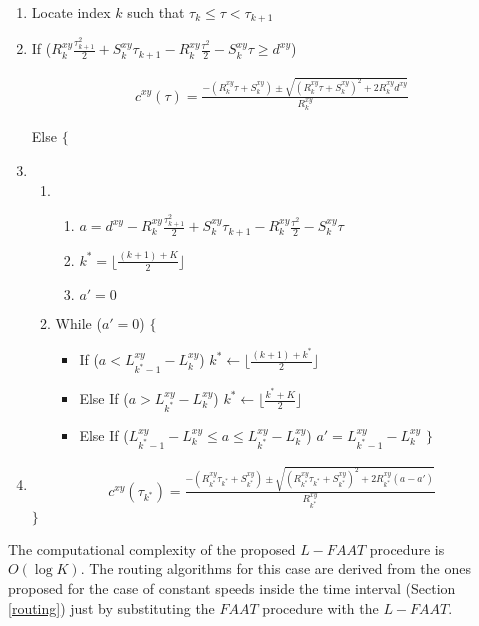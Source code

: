 \documentclass[conference]{IEEEtran}
\begin{document}
\begin{enumerate}
    \item Locate index $k$ such that $\tau_k \leq \tau < \tau_{k+1}$ \label{fattindex}
    \item If ($R_k^{xy}\frac{\tau_{k+1}^2}{2}+S_k^{xy}\tau_{k+1}-R_k^{xy}\frac{\tau^2}{2}-S_k^{xy}\tau\geq d^{xy}$) 
    
\begin{eqnarray}
 &c^{xy}(\tau)=\frac{-(R_k^{xy}\tau+S_k^{xy})\pm\sqrt{(R_k^{xy}\tau+S_k^{xy})^2+2R_k^{xy}d^{xy}}}{R_k^{xy}}& \nonumber
\end{eqnarray}

    Else $\{$
    \item
    \begin{enumerate}
        \item 
        \begin{enumerate}
            \item $a=d^{xy}-R_k^{xy}\frac{\tau_{k+1}^2}{2}+S_k^{xy}\tau_{k+1}-R_k^{xy}\frac{\tau^2}{2}-S_k^{xy}\tau$
            \item $k^*= \lfloor \frac{(k+1)+K}{2} \rfloor$
            \item $a'=0$
        \end{enumerate} 
        \item While ($a'=0$) $\{$  \label{fattwhile}
        \begin{itemize}
            \item If ($a< L_{k^*-1}^{xy}-L_{k}^{xy}$) $k^*\leftarrow \lfloor \frac{(k+1)+k^*}{2} \rfloor $
            \item Else If ($a> L_{k^*}^{xy}-L_{k}^{xy}$) $k^*\leftarrow \lfloor \frac{k^*+K}{2} \rfloor $
            \item Else If ($L_{k^*-1}^{xy}-L_{k}^{xy}\leq a \leq L_{k^*}^{xy}-L_{k}^{xy}$) $a'=L_{k^*-1}^{xy}-L_{k}^{xy}$ $\}$
        \end{itemize}
    \end{enumerate}
    \item 
    \begin{eqnarray}
    &c^{xy}(\tau_{k^*})=\frac{-(R_{k^*}^{xy}\tau_{k^*}+S_{k^*}^{xy})\pm\sqrt{(R_{k^*}^{xy}\tau_{k^*}+S_{k^*}^{xy})^2+2R_{k^*}^{xy}(a-a')}}{R_{k^*}^{xy}}& \nonumber
    \end{eqnarray}
 $\}$
\end{enumerate}

The computational complexity of the proposed $L-FAAT$ procedure is $O(\log K)$. The routing algorithms for this case are derived from the ones proposed for the case of constant speeds inside the time interval (Section \ref{routing}) just by substituting the $FAAT$ procedure with the $L-FAAT$.
\end{document}
